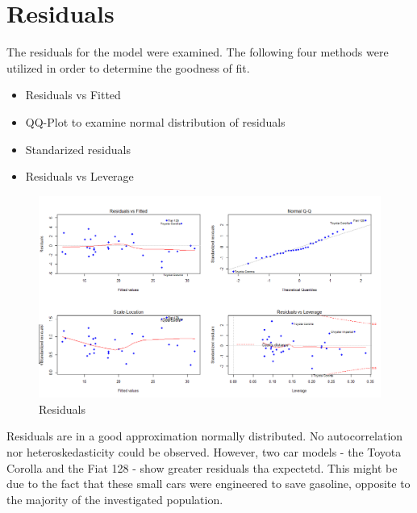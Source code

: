 \documentclass[10pt,a4paper]{article}
\begin{document}
\newpage
\section{Residuals}

The residuals for the model were examined. The following four methods were utilized in order to determine the goodness of fit.

\begin{itemize}
 \item Residuals vs Fitted
 \item QQ-Plot to examine normal distribution of residuals
 \item Standarized residuals
 \item Residuals vs Leverage
\end{itemize}

\begin{figure}
\centering
\includegraphics[width=1.2\linewidth]{residuals}
\caption[Residuals]{Residuals}
\end{figure}

Residuals are in a good approximation normally distributed. No autocorrelation nor heteroskedasticity could be observed.
However, two car models - the Toyota Corolla and the Fiat 128 - show greater residuals tha expectetd. This might be due to the fact that these small cars were engineered to save gasoline, opposite to the majority of the investigated population.
\end{document}
